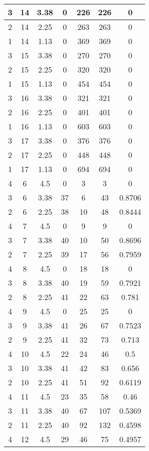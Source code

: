 \documentclass[letterpaper, 12pt]{article}
\begin{document}
\begin{longtable}{|c|c|c|c|c|c|c|}
\hline
3 & 14 & 3.38 & 0 & 226 & 226 & 0 \\
\hline
2 & 14 & 2.25 & 0 & 263 & 263 & 0 \\
\hline
1 & 14 & 1.13 & 0 & 369 & 369 & 0 \\
\hline
3 & 15 & 3.38 & 0 & 270 & 270 & 0 \\
\hline
2 & 15 & 2.25 & 0 & 320 & 320 & 0 \\
\hline
1 & 15 & 1.13 & 0 & 454 & 454 & 0 \\
\hline
3 & 16 & 3.38 & 0 & 321 & 321 & 0 \\
\hline
2 & 16 & 2.25 & 0 & 401 & 401 & 0 \\
\hline
1 & 16 & 1.13 & 0 & 603 & 603 & 0 \\
\hline
3 & 17 & 3.38 & 0 & 376 & 376 & 0 \\
\hline
2 & 17 & 2.25 & 0 & 448 & 448 & 0 \\
\hline
1 & 17 & 1.13 & 0 & 694 & 694 & 0 \\
\hline
4 & 6 & 4.5 & 0 & 3 & 3 & 0 \\
\hline
3 & 6 & 3.38 & 37 & 6 & 43 & 0.8706 \\
\hline
2 & 6 & 2.25 & 38 & 10 & 48 & 0.8444 \\
\hline
4 & 7 & 4.5 & 0 & 9 & 9 & 0 \\
\hline
3 & 7 & 3.38 & 40 & 10 & 50 & 0.8696 \\
\hline
2 & 7 & 2.25 & 39 & 17 & 56 & 0.7959 \\
\hline
4 & 8 & 4.5 & 0 & 18 & 18 & 0 \\
\hline
3 & 8 & 3.38 & 40 & 19 & 59 & 0.7921 \\
\hline
2 & 8 & 2.25 & 41 & 22 & 63 & 0.781 \\
\hline
4 & 9 & 4.5 & 0 & 25 & 25 & 0 \\
\hline
3 & 9 & 3.38 & 41 & 26 & 67 & 0.7523 \\
\hline
2 & 9 & 2.25 & 41 & 32 & 73 & 0.713 \\
\hline
4 & 10 & 4.5 & 22 & 24 & 46 & 0.5 \\
\hline
3 & 10 & 3.38 & 41 & 42 & 83 & 0.656 \\
\hline
2 & 10 & 2.25 & 41 & 51 & 92 & 0.6119 \\
\hline
4 & 11 & 4.5 & 23 & 35 & 58 & 0.46 \\
\hline
3 & 11 & 3.38 & 40 & 67 & 107 & 0.5369 \\
\hline
2 & 11 & 2.25 & 40 & 92 & 132 & 0.4598 \\
\hline
4 & 12 & 4.5 & 29 & 46 & 75 & 0.4957 \\

\end{longtable}
\end{document}
